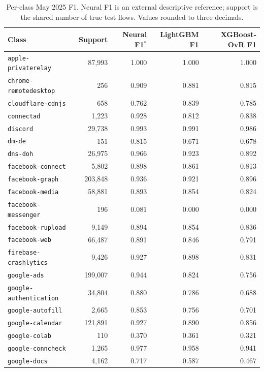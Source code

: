 \documentclass[conference]{IEEEtran}
\begin{document}
\small
\begin{table}[t]
\centering
\caption{Per-class May 2025 F1. Neural F1 is an external descriptive reference; support is the shared number of true test flows. Values rounded to three decimals.}\label{tab:perclass}
{\footnotesize
\setlength{\tabcolsep}{2.5pt}
\renewcommand{\arraystretch}{0.75}
\begin{tabular*}{\textwidth}{@{\extracolsep{\fill}}lrrrr@{}}
\toprule
Class & Support & Neural F1$^{*}$ & LightGBM F1 & XGBoost-OvR F1\\
\midrule
\texttt{apple-privaterelay} & 87,993 & 1.000 & 1.000 & 1.000 \\
\texttt{chrome-remotedesktop} & 256 & 0.909 & 0.881 & 0.815 \\
\texttt{cloudflare-cdnjs} & 658 & 0.762 & 0.839 & 0.785 \\
\texttt{connectad} & 1,223 & 0.928 & 0.812 & 0.838 \\
\texttt{discord} & 29,738 & 0.993 & 0.991 & 0.986 \\
\texttt{dm-de} & 151 & 0.815 & 0.671 & 0.678 \\
\texttt{dns-doh} & 26,975 & 0.966 & 0.923 & 0.892 \\
\texttt{facebook-connect} & 5,802 & 0.898 & 0.861 & 0.813 \\
\texttt{facebook-graph} & 203,848 & 0.936 & 0.921 & 0.896 \\
\texttt{facebook-media} & 58,881 & 0.893 & 0.854 & 0.824 \\
\texttt{facebook-messenger} & 196 & 0.081 & 0.000 & 0.000 \\
\texttt{facebook-rupload} & 9,149 & 0.894 & 0.854 & 0.836 \\
\texttt{facebook-web} & 66,487 & 0.891 & 0.846 & 0.791 \\
\texttt{firebase-crashlytics} & 9,426 & 0.927 & 0.898 & 0.831 \\
\texttt{google-ads} & 199,007 & 0.944 & 0.824 & 0.756 \\
\texttt{google-authentication} & 34,804 & 0.880 & 0.786 & 0.688 \\
\texttt{google-autofill} & 2,665 & 0.853 & 0.756 & 0.701 \\
\texttt{google-calendar} & 121,891 & 0.927 & 0.890 & 0.856 \\
\texttt{google-colab} & 110 & 0.370 & 0.361 & 0.321 \\
\texttt{google-conncheck} & 1,265 & 0.977 & 0.958 & 0.941 \\
\texttt{google-docs} & 4,162 & 0.717 & 0.587 & 0.467 \\

\end{tabular*}}
\end{table}
\end{document}
